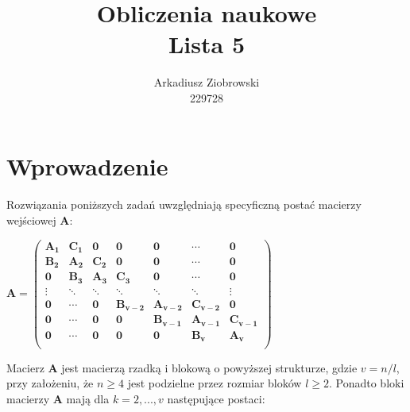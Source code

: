 \documentclass[a4paper]{article}
\title{\huge
  Obliczenia naukowe \\
  \large Lista 5}
\author{Arkadiusz Ziobrowski \\ 229728}
\date{}
\begin{document}
\maketitle

\pagebreak


\section*{Wprowadzenie}
\paragraph{}
Rozwiązania poniższych zadań uwzględniają specyficzną postać macierzy wejściowej $\mathbf{A}$:

\begin{center}
$\mathbf{
	A = 
 	\begin{pmatrix}
 	A_{1} & C_{1} & 0 & 0 & 0 & \cdots & 0 \\
  	B_{2} & A_{2} & C_{2} & 0 & 0 & \cdots & 0 \\
  	0 & B_{3} & A_{3} & C_{3} & 0 & \cdots & 0 \\ 
  	\vdots  & \ddots  & \ddots & \ddots & \ddots & \ddots & \vdots  \\
  	0 & \cdots & 0 & B_{v - 2} & A_{v - 2} & C_{v - 2} & 0 \\
  	0 & \cdots & 0 & 0 & B_{v - 1} & A_{v - 1} & C_{v - 1} \\
  	0 & \cdots & 0 & 0 & 0 & B_{v} & A_{v} \\
 	\end{pmatrix}
 }$
\end{center}

Macierz $\mathbf{A}$ jest macierzą rzadką i blokową o powyższej strukturze, gdzie $v = n / l$, przy założeniu, że $n \geq 4$ jest podzielne przez rozmiar bloków $l \geq 2$. Ponadto bloki macierzy $\mathbf{A}$ mają dla $k = 2, ..., v$ następujące postaci:
\end{document}
